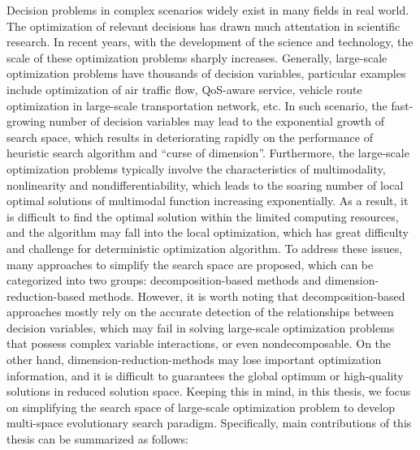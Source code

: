 \begin{eabstract}	%
Decision problems in complex scenarios widely exist in many fields in real world. The optimization of relevant decisions has drawn much attentation in scientific research. In recent years, with the development of the science and technology, the scale of these optimization problems sharply increases. Generally, large-scale optimization problems have thousands of decision variables, particular examples include optimization of air traffic flow, QoS-aware service, vehicle route optimization in large-scale transportation network, etc. In such scenario, the fast-growing number of decision variables may lead to the exponential growth of search space, which results in deteriorating rapidly on the performance of heuristic search algorithm and “curse of dimension”. Furthermore, the large-scale optimization problems typically involve the characteristics of multimodality, nonlinearity and nondifferentiability, which leads to the soaring number of local optimal solutions of multimodal function increasing exponentially. As a result, it is difficult to find the optimal solution within the limited computing resources, and the algorithm may fall into the local optimization, which has great difficulty and challenge for deterministic optimization algorithm. To address these issues, many approaches to simplify the search space are proposed, which can be categorized into two groups: decomposition-based methods and dimension-reduction-based methods. However, it is worth noting that decomposition-based approaches mostly rely on the accurate detection of the relationships between decision variables, which may fail in solving large-scale optimization problems that possess complex variable interactions, or even nondecomposable. On the other hand, dimension-reduction-methods may lose important optimization information, and it is difficult to guarantees the global optimum or high-quality solutions in reduced solution space. Keeping this in mind, in this thesis, we focus on simplifying the search space of large-scale optimization problem to develop multi-space evolutionary search paradigm. Specifically, main contributions of this thesis can be summarized as follows:


\end{eabstract}
